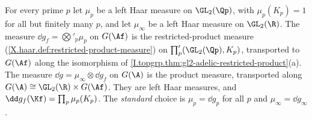 For every prime $p$ let $\mu_p$ be a left Haar measure on $\GL_2(\Qp)$, with $\mu_p(K_p)=1$ for all but finitely many
$p$, and let $\mu_\infty$ be a left Haar measure on $\GL_2(\R)$. The measure $\dd g_f=\bigotimes'_p\mu_p$ on $G(\Af)$ is
the restricted-product measure (\cref{X.haar.def:restricted-product-measure}) on
$\prod'_p(\GL_2(\Qp),K_p)$, transported to $G(\Af)$ along the isomorphism of
\cref{I.topgrp.thm:gl2-adelic-restricted-product}(a). The measure $\dd g=\mu_\infty\otimes\dd g_f$ on $G(\A)$ is the
product measure, transported along $G(\A)\cong\GL_2(\R)\times G(\Af)$. They are left Haar measures, and
$\dd g_f(\Kf)=\prod_p\mu_p(K_p)$. The \emph{standard} choice is $\mu_p=\dd g_p$ for all $p$ and
$\mu_\infty=\dd g_\infty$.
